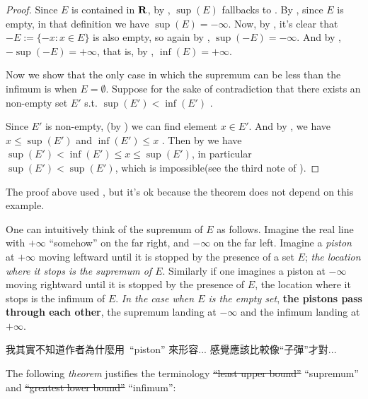 \begin{proof}
Since \(E\) is contained in \(\mathbf{R}\), by , \(\sup(E)\) fallbacks to .
By , since \(E\) is empty, in that definition we have \(\sup(E) = -\infty\).
Now, by , it's clear that \(-E := \{ -x : x \in E \}\) is also empty, so again by , \(\sup(-E) = -\infty\).
And by , \(-\sup(-E) = +\infty\), that is, by , \(\inf(E) = +\infty\).

Now we show that the only case in which the supremum can be less than the infimum is when \(E = \emptyset\).
Suppose for the sake of contradiction that there exists an non-empty set \(E'\) s.t. \(\sup(E') < \inf(E')\) .

Since \(E'\) is non-empty, (by ) we can find element \(x \in E'\).
And by , we have \(x \le \sup(E')\)  and \(\inf(E') \le x\) .
Then by  we have \(\sup(E') < \inf(E') \le x \le \sup(E')\), in particular \(\sup(E') < \sup(E')\), which is impossible(see the third note of ).
\end{proof}

\begin{note}
The proof above used , but it's ok because the theorem does not depend on this example.
\end{note}

\begin{note}
One can intuitively think of the supremum of \(E\) as follows.
Imagine the real line with \(+\infty\) ``somehow'' on the far right, and \(-\infty\) on the far left.
Imagine a \emph{piston} at \(+\infty\) moving leftward until it is stopped by the presence of a set \(E\);
\emph{the location where it stops is the supremum of \(E\)}.
Similarly if one imagines a piston at \(-\infty\) moving rightward until it is stopped by the presence of \(E\), the location where it stops is the infimum of \(E\).
\emph{In the case when \(E\) is the empty set}, \textbf{the pistons pass through each other}, the supremum landing at \(-\infty\) and the infimum landing at \(+\infty\).
\end{note}

\begin{note}
我其實不知道作者為什麼用\ ``piston'' 來形容... 感覺應該比較像``子彈''才對...
\end{note}

The following \emph{theorem} justifies the terminology \sout{``least upper bound''} ``supremum'' and \sout{``greatest lower bound''} ``infimum'':

